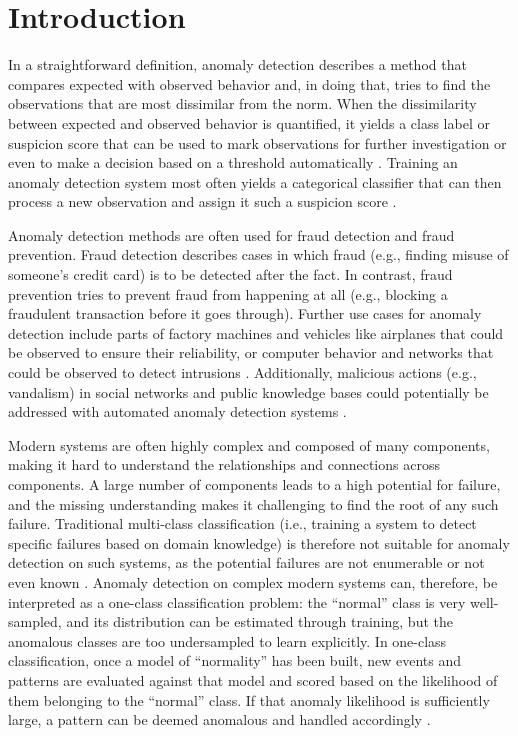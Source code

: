 \chapter{Introduction}
\label{c:introduction}

In a straightforward definition, anomaly detection describes a method that compares expected with observed behavior and, in doing that, tries to find the observations that are most dissimilar from the norm. When the dissimilarity between expected and observed behavior is quantified, it yields a class label or suspicion score that can be used to mark observations for further investigation or even to make a decision based on a threshold automatically \citep{bolton_statistical_2002}. Training an anomaly detection system most often yields a categorical classifier that can then process a new observation and assign it such a suspicion score \citep{hayes_contextual_2015}.

Anomaly detection methods are often used for fraud detection and fraud prevention. Fraud detection describes cases in which fraud (e.g., finding misuse of someone's credit card) is to be detected after the fact. In contrast, fraud prevention tries to prevent fraud from happening at all (e.g., blocking a fraudulent transaction before it goes through). Further use cases for anomaly detection include parts of factory machines and vehicles like airplanes that could be observed to ensure their reliability, or computer behavior and networks that could be observed to detect intrusions \citep{chandola_anomaly_2012}. Additionally, malicious actions (e.g., vandalism) in social networks and public knowledge bases could potentially be addressed with automated anomaly detection systems \citep{heindorf_vandalism_2016}.

Modern systems are often highly complex and composed of many components, making it hard to understand the relationships and connections across components. A large number of components leads to a high potential for failure, and the missing understanding makes it challenging to find the root of any such failure. Traditional multi-class classification (i.e., training a system to detect specific failures based on domain knowledge) is therefore not suitable for anomaly detection on such systems, as the potential failures are not enumerable or not even known \citep{pimentel_review_2014}. Anomaly detection on complex modern systems can, therefore, be interpreted as a one-class classification problem: the ``normal'' class is very well-sampled, and its distribution can be estimated through training, but the anomalous classes are too undersampled to learn explicitly. In one-class classification, once a model of ``normality'' has been built, new events and patterns are evaluated against that model and scored based on the likelihood of them belonging to the ``normal'' class. If that anomaly likelihood is sufficiently large, a pattern can be deemed anomalous and handled accordingly \citep{pimentel_review_2014}.

